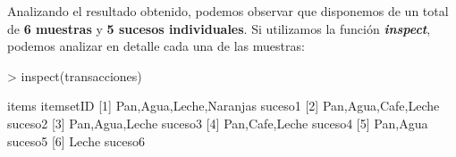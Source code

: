 \documentclass [a4paper] {article}
\begin{document}
Analizando el resultado obtenido, podemos observar que disponemos de un total de \textbf{6 muestras} y \textbf{5 sucesos individuales}.
Si utilizamos la función \textbf{\textit{inspect}}, podemos analizar en detalle cada una de las muestras:
\begin{Schunk}
\begin{Sinput}
> inspect(transacciones)
\end{Sinput}
\begin{Soutput}
    items                     itemsetID
[1] {Pan,Agua,Leche,Naranjas} suceso1  
[2] {Pan,Agua,Cafe,Leche}     suceso2  
[3] {Pan,Agua,Leche}          suceso3  
[4] {Pan,Cafe,Leche}          suceso4  
[5] {Pan,Agua}                suceso5  
[6] {Leche}                   suceso6  
\end{Soutput}
\end{Schunk}
\end{document}
